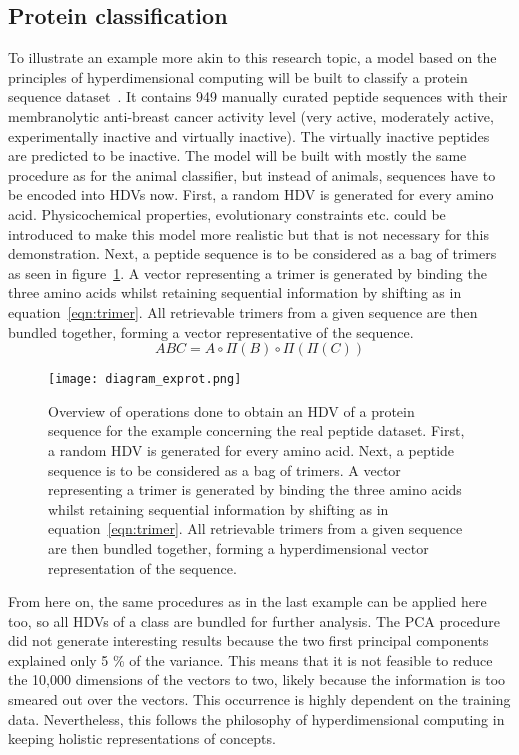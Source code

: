 \subsection*{Protein classification}
\label{ssec:protclas}
To illustrate an example more akin to this research topic, a model based on the principles of hyperdimensional computing will be built to classify a protein sequence dataset~\cite{anticancer}. It contains 949 manually curated peptide sequences with their membranolytic anti-breast cancer activity level (very active, moderately active, experimentally inactive and virtually inactive). The virtually inactive peptides are predicted to be inactive. The model will be built with mostly the same procedure as for the animal classifier, but instead of animals, sequences have to be encoded into HDVs now. First, a random HDV is generated for every amino acid. Physicochemical properties, evolutionary constraints etc. could be introduced to make this model more realistic but that is not necessary for this demonstration. Next, a peptide sequence is to be considered as a bag of trimers as seen in figure~\ref{fig:diagram_exprot5}. A vector representing a trimer is generated by binding the three amino acids whilst retaining sequential information by shifting as in equation~\ref{eqn:trimer}. All retrievable trimers from a given sequence are then bundled together, forming a vector representative of the sequence. 
\begin{equation}\label{eqn:trimer}
    ABC = A \circ \Pi (B) \circ \Pi (\Pi (C))
\end{equation}
\begin{figure}[h]
    \centering
    \texttt{[image: diagram\_exprot.png]}
    \caption{Overview of operations done to obtain an HDV of a protein sequence for the example concerning the real peptide dataset. First, a random HDV is generated for every amino acid. Next, a peptide sequence is to be considered as a bag of trimers. A vector representing a trimer is generated by binding the three amino acids whilst retaining sequential information by shifting as in equation~\ref{eqn:trimer}. All retrievable trimers from a given sequence are then bundled together, forming a hyperdimensional vector representation of the sequence.}
    \label{fig:diagram_exprot5}
\end{figure}
From here on, the same procedures as in the last example can be applied here too, so all HDVs of a class are bundled for further analysis. The PCA procedure did not generate interesting results because the two first principal components explained only 5 \% of the variance. This means that it is not feasible to reduce the 10,000 dimensions of the vectors to two, likely because the information is too smeared out over the vectors. This occurrence is highly dependent on the training data. Nevertheless, this follows the philosophy of hyperdimensional computing in keeping holistic representations of concepts.


